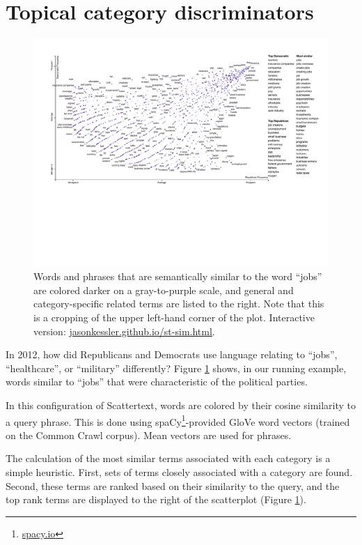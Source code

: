 \documentclass[11pt,a4paper]{article}
\begin{document}
\section{Topical category discriminators}
\begin{figure}[h]
  \includegraphics[width=\linewidth]{similarity_scattertext_portion}
  \caption{Words and phrases that are semantically similar to the word ``jobs'' are colored darker on a gray-to-purple scale, and general and category-specific related terms are listed to the right. Note that this is a cropping of the upper left-hand corner of the plot. Interactive version: \href{https://jasonkessler.github.io/st-sim.html}{jasonkessler.github.io/st-sim.html}.}
  \label{scattertextembeddings}
\end{figure}
\label{embeddings}
In 2012, how did Republicans and Democrats use language relating to ``jobs'', ``healthcare'', or ``military'' differently?   Figure \ref{scattertextembeddings} shows, in our running example, words similar to ``jobs'' that were characteristic of the political parties.  

In this configuration of Scattertext, words are colored by their cosine similarity to a query phrase.  This is done using spaCy\footnote{\href{https://spacy.io/}{spacy.io}}-provided GloVe \cite{glove} word vectors (trained on the Common Crawl corpus). Mean vectors are used for phrases.

The calculation of the most similar terms associated with each category is a simple heuristic.  First, sets of terms closely associated with a category are found. Second, these terms are ranked based on their similarity to the query, and the top rank terms are displayed to the right of the scatterplot (Figure \ref{scattertextembeddings}).  
\end{document}
